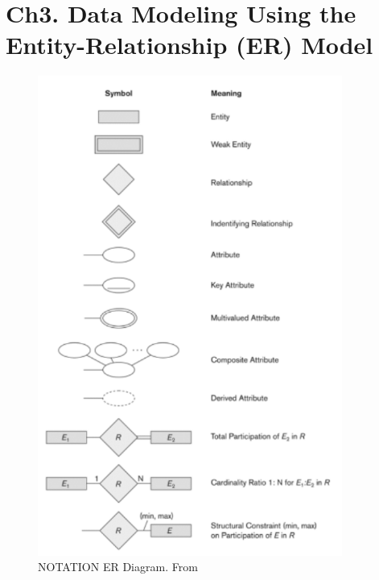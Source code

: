 \newpage
\section{Ch3. Data Modeling Using the Entity-Relationship (ER) Model}
\begin{figure}[!h]
    \centering
    \includegraphics[width=10cm]{image/notation-er-diagrams.pdf}
    \caption{NOTATION ER Diagram. From \cite{}}
\end{figure}


